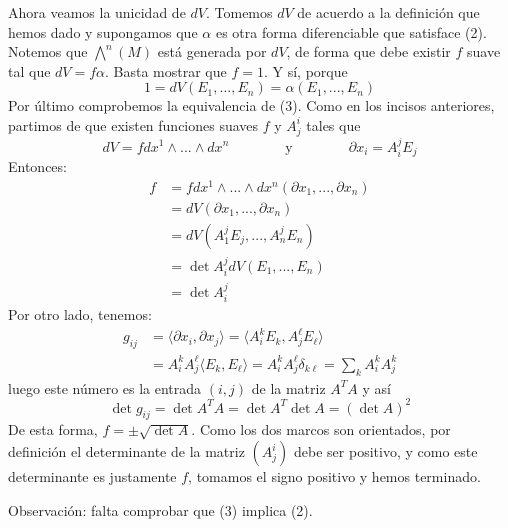 \documentclass[11pt]{article}
\begin{document}
Ahora veamos la unicidad de $dV$. Tomemos $dV$ de acuerdo a la definición que hemos dado y supongamos que $\alpha$ es otra forma diferenciable que satisface (2). Notemos que $\bigwedge^n(M)$ está generada por $dV$, de forma que debe existir $f$ suave tal que $dV=f\alpha$. Basta mostrar que $f=1$. Y sí, porque
$$1=dV(E_1,...,E_n)=\alpha(E_1,...,E_n)$$
Por último comprobemos la equivalencia de (3). Como en los incisos anteriores, partimos de que existen funciones suaves $f$ y $A^i_j$ tales que
$$dV=fdx^1\wedge...\wedge dx^n \qquad\qquad \text{y} \qquad \qquad\partial x_i=A^j_iE_j$$
Entonces:
\begin{align*}
f&=fdx^1\wedge...\wedge dx^n(\partial x_1,...,\partial x_n)\\
&=dV(\partial x_1,...,\partial x_n)\\
&=dV(A^j_1E_j,...,A^j_nE_n)\\
&=\det{A^j_i}dV(E_1,...,E_n)\\
&=\det{A^j_i}
\end{align*}
Por otro lado, tenemos:
\begin{align*}g_{ij}&=\langle \partial x_i,\partial x_j\rangle=\langle A^k_i E_k,A^\ell_jE_\ell\rangle\\
&=A^k_iA^\ell_j\langle E_k,E_\ell\rangle=A^k_iA^\ell_j\delta_{k\ell}=\sum_kA^k_iA^k_j
\end{align*}
luego este número es la entrada $(i,j)$ de la matriz $A^TA$ y así
$$\det{g_{ij}}=\det{A^TA}=\det{A^T}\det{A}=(\det{A})^2$$
De esta forma, $f=\pm\sqrt{\det{A}}$. Como los dos marcos son orientados, por definición el determinante de la matriz $(A^i_j)$ debe ser positivo, y como este determinante es justamente $f$, tomamos el signo positivo y hemos terminado.\par
Observación: falta comprobar que (3) implica (2).\newpage
\end{document}
